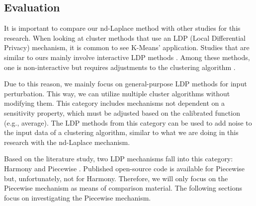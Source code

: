 \subsection{Evaluation}
It is important to compare our nd-Laplace method with other studies for this research.
When looking at cluster methods that use an LDP (Local Differential Privacy) mechanism, it is common to see K-Means' application.
Studies that are similar to ours mainly involve interactive LDP methods \citep{xia_distributed_2020, yuan_privacypreserving_2021, 9679364}.
Among these methods, one is non-interactive but requires adjustments to the clustering algorithm \citep{sun_distributed_2019}.

Due to this reason, we mainly focus on general-purpose LDP methods for input perturbation.
This way, we can utilize multiple cluster algorithms without modifying them.
This category includes mechanisms not dependent on a sensitivity property, which must be adjusted based on the calibrated function (e.g., average).
The LDP methods from this category can be used to add noise to the input data of a clustering algorithm, similar to what we are doing in this research with the nd-Laplace mechanism.

Based on the literature study, two LDP mechanisms fall into this category: Harmony and Piecewise \citep{nguyen_collecting_2016, wang_collecting_2019}.
Published open-source code is available for Piecewise but, unfortunately, not for Harmony.
Therefore, we will only focus on the Piecewise mechanism as means of comparison material.
The following sections focus on investigating the Piecewise mechanism.

